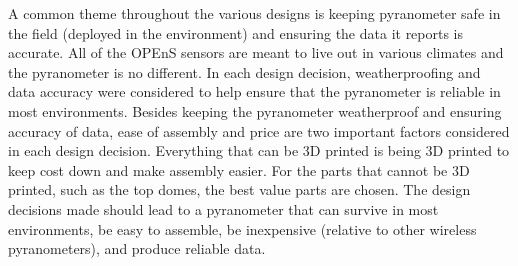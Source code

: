 \documentclass[10pt,draftclsnofoot,onecolumn,letterpaper]{article}
\begin{document}
A common theme throughout the various designs is keeping pyranometer safe in the field (deployed in the environment) and ensuring the data it reports is accurate. All of the OPEnS sensors are meant to live out in various climates and the pyranometer is no different. In each design decision, weatherproofing and data accuracy were considered to help ensure that the pyranometer is reliable in most environments. Besides keeping the pyranometer weatherproof and ensuring accuracy of data, ease of assembly and price are two important factors considered in each design decision. Everything that can be 3D printed is being 3D printed to keep cost down and make assembly easier. For the parts that cannot be 3D printed, such as the top domes, the best value parts are chosen. The design decisions made should lead to a pyranometer that can survive in most environments, be easy to assemble, be inexpensive (relative to other wireless pyranometers), and produce reliable data.
\end{document}

